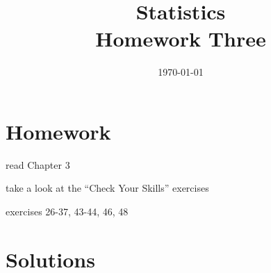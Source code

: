 \documentclass[letterpaper, landscape]{exam}
\title{Statistics \\ Homework Three}
\date{\today}
\author{}
\begin{document}
  \maketitle

  \section{Homework}
    \begin{itemize*}
      \item read Chapter 3 
      \item take a look at the ``Check Your Skills'' exercises
      \item exercises 26-37, 43-44, 46, 48
    \end{itemize*}

  \ifprintanswers
  \section{Solutions}
\end{document}
